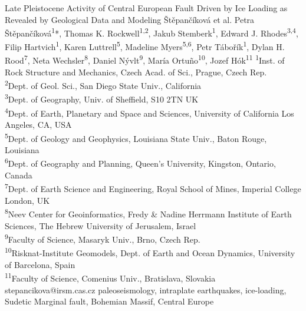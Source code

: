 \abstract
{Late Pleistocene Activity of Central European Fault Driven by Ice Loading as Revealed by Geological Data and Modeling} 
{Štěpančíková et al.} 
{Petra Štěpančíková\textsuperscript{1}*, Thomas K. Rockwell\textsuperscript{1,2}, Jakub Stemberk\textsuperscript{1}, Edward J. Rhodes\textsuperscript{3,4}, Filip Hartvich\textsuperscript{1}, Karen Luttrell\textsuperscript{5}, Madeline Myers\textsuperscript{5,6}, Petr Tábořík\textsuperscript{1}, Dylan H. Rood\textsuperscript{7}, Neta Wechsler\textsuperscript{8}, Daniel Nývlt\textsuperscript{9}, María Ortuño\textsuperscript{10}, Jozef Hók\textsuperscript{11}} 
{\TLtag} 
{
	\textsuperscript{1}Inst. of Rock Structure and Mechanics, Czech Acad. of Sci., Prague, Czech Rep.\\
	\textsuperscript{2}Dept. of Geol. Sci., San Diego State Univ., California\\
	\textsuperscript{3}Dept. of Geography, Univ. of Sheffield, S10 2TN UK\\
	\textsuperscript{4}Dept. of Earth, Planetary and Space and Sciences, University of California Los Angeles, CA, USA\\
	\textsuperscript{5}Dept. of Geology and Geophysics, Louisiana State Univ., Baton Rouge, Louisiana\\
	\textsuperscript{6}Dept. of Geography and Planning, Queen’s University, Kingston, Ontario, Canada\\
	\textsuperscript{7}Dept. of Earth Science and Engineering, Royal School of Mines, Imperial College London, UK\\
	\textsuperscript{8}Neev Center for Geoinformatics, Fredy \& Nadine Herrmann Institute of Earth Sciences, The Hebrew University of Jerusalem, Israel\\
	\textsuperscript{9}Faculty of Science, Masaryk Univ., Brno, Czech Rep.\\
	\textsuperscript{10}Risknat-Institute Geomodels, Dept. of Earth and Ocean Dynamics, University of Barcelona, Spain\\
	\textsuperscript{11}Faculty of Science, Comenius Univ., Bratislava, Slovakia  
}
{stepancikova@irsm.cas.cz}  %
{paleoseismology, intraplate earthquakes, ice-loading, Sudetic Marginal fault, Bohemian Massif, Central Europe}
